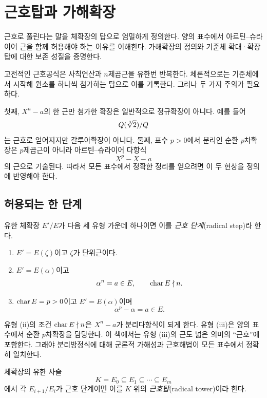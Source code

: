 \clearpage
\section{근호탑과 가해확장}
\label{sec:radical-towers}

\begin{learninggoal}
근호로 풀린다는 말을 체확장의 탑으로 엄밀하게 정의한다. 양의 표수에서 아르틴--슈라이어 근을 함께 허용해야 하는 이유를 이해한다. 가해확장의 정의와 기준체 확대·확장탑에 대한 보존 성질을 증명한다.
\end{learninggoal}

고전적인 근호공식은 사칙연산과 $n$제곱근을 유한번 반복한다. 체론적으로는 기준체에서 시작해 원소를 하나씩 첨가하는 탑으로 이를 기록한다. 그러나 두 가지 주의가 필요하다.

첫째, $X^n-a$의 한 근만 첨가한 확장은 일반적으로 정규확장이 아니다. 예를 들어
\[
  Q(\sqrt[3]{2})/Q
\]
는 근호로 얻어지지만 갈루아확장이 아니다. 둘째, 표수 $p>0$에서 분리인 순환 $p$차확장은 $p$제곱근이 아니라 아르틴--슈라이어 다항식
\[
  X^p-X-a
\]
의 근으로 기술된다. 따라서 모든 표수에서 정확한 정리를 얻으려면 이 두 현상을 정의에 반영해야 한다.

\subsection{허용되는 한 단계}

\begin{definition}[근호 단계]
유한 체확장 $E'/E$가 다음 세 유형 가운데 하나이면 이를 \emph{근호 단계}(radical step)라 한다.
\begin{enumerate}[label=(\roman*)]
  \item $E'=E(\zeta)$이고 $\zeta$가 단위근이다.
  \item $E'=E(\alpha)$이고
  \[
    \alpha^n=a\in E,
    \qquad
    \operatorname{char} E\nmid n.
  \]
  \item $\operatorname{char} E=p>0$이고 $E'=E(\alpha)$이며
  \[
    \alpha^p-\alpha=a\in E.
  \]
\end{enumerate}
\end{definition}

유형 (ii)의 조건 $\operatorname{char} E\nmid n$은 $X^n-a$가 분리다항식이 되게 한다. 유형 (iii)은 양의 표수에서 순환 $p$차확장을 담당한다. 이 책에서는 유형 (iii)의 근도 넓은 의미의 ``근호''에 포함한다. 그래야 분리방정식에 대해 군론적 가해성과 근호해법이 모든 표수에서 정확히 일치한다.

\begin{definition}[근호탑]
체확장의 유한 사슬
\[
  K=E_0\subseteq E_1\subseteq\cdots\subseteq E_m
\]
에서 각 $E_{i+1}/E_i$가 근호 단계이면 이를 $K$ 위의 \emph{근호탑}(radical tower)이라 한다.
\end{definition}

